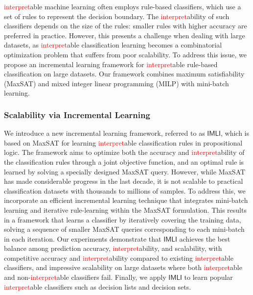 \documentclass[10pt]{article}
\newcommand{\red}[1]{\textcolor{red}{#1}}
\begin{document}
	\red{interpret}able machine learning often employs rule-based classifiers, which use a set of rules to represent the decision boundary. The \red{interpret}ability of such classifiers depends on the size of the rules: smaller rules with higher accuracy are preferred in practice. However, this presents a challenge when dealing with large datasets, as \red{interpret}able classification learning becomes a combinatorial optimization problem that suffers from poor scalability. To address this issue, we propose an incremental learning framework for \red{interpret}able rule-based classification on large datasets. Our framework combines maximum satisfiability (MaxSAT) and mixed integer linear programming (MILP) with mini-batch learning.
	
	\subsubsection*{Scalability via Incremental Learning}
	We introduce a new incremental learning framework, referred to as $\mathsf{IMLI}$, which is based on MaxSAT for learning \red{interpret}able classification rules in propositional logic. The framework aims to optimize both the accuracy and \red{interpret}ability of the classification rules through a joint objective function, and an optimal rule is learned by solving a specially designed MaxSAT query. However, while MaxSAT has made considerable progress in the last decade, it is not scalable to practical classification datasets with thousands to millions of samples. To address this, we incorporate an efficient incremental learning technique that integrates mini-batch learning and iterative rule-learning within the MaxSAT formulation. This results in a framework that learns a classifier by iteratively covering the training data, solving a sequence of smaller MaxSAT queries corresponding to each mini-batch in each iteration. Our experiments demonstrate that $\mathsf{IMLI}$ achieves the best balance among prediction accuracy, \red{interpret}ability, and scalability, with competitive accuracy and \red{interpret}ability compared to existing \red{interpret}able classifiers, and impressive scalability on large datasets where both \red{interpret}able and non-\red{interpret}able classifiers fail. Finally, we apply $\mathsf{IMLI}$ to learn popular \red{interpret}able classifiers such as decision lists and decision sets.
	
\end{document}
